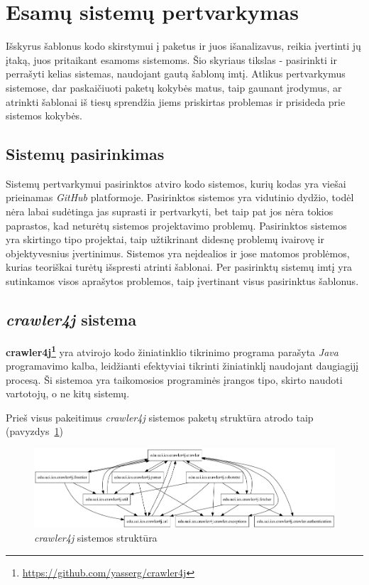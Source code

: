 \section{Esamų sistemų pertvarkymas}
Išskyrus šablonus kodo skirstymui į paketus ir juos išanalizavus, reikia įvertinti jų įtaką, juos pritaikant esamoms sistemoms.
Šio skyriaus tikslas - pasirinkti ir perrašyti kelias sistemas, naudojant gautą šablonų imtį.
Atlikus pertvarkymus sistemose, dar paskaičiuoti paketų kokybės matus,
taip gaunant įrodymus, ar atrinkti šablonai iš tiesų sprendžia
jiems priskirtas problemas ir prisideda prie sistemos kokybės.


\subsection{Sistemų pasirinkimas}
Sistemų pertvarkymui pasirinktos atviro kodo sistemos, kurių kodas yra viešai prieinamas \textit{GitHub} platformoje.
Pasirinktos sistemos yra vidutinio dydžio, todėl nėra labai sudėtinga jas suprasti ir pertvarkyti, bet taip pat jos nėra
tokios paprastos, kad neturėtų sistemos projektavimo problemų.
Pasirinktos sistemos yra skirtingo tipo projektai, taip užtikrinant didesnę problemų ivairovę ir objektyvesnius įvertinimus.
Sistemos yra neįdealios ir jose matomos problėmos, kurias teoriškai turėtų išspresti atrinti šablonai.
Per pasirinktų sistemų imtį yra sutinkamos visos aprašytos problemos, taip įvertinant visus pasirinktus šablonus.

\subsection{\textit{crawler4j} sistema}
\textbf{crawler4j\footnote{\url{https://github.com/yasserg/crawler4j}}} yra atvirojo kodo
žiniatinklio tikrinimo  programa parašyta \textit{Java} programavimo kalba, leidžianti
efektyviai tikrinti žiniatinklį naudojant daugiagijį  procesą.
Ši sistemoa yra taikomosios programinės įrangos tipo, skirto naudoti vartotojų, o ne kitų sistemų.

Prieš visus pakeitimus \textit{crawler4j} sistemos paketų struktūra atrodo taip (pavyzdys~\ref{fig:crawler_packages_orig})
\begin{figure}[H]
    \centering
    \includegraphics[scale=0.5]{img/crawler_packages_orig}
    \caption{\textit{crawler4j} sistemos struktūra}
    \label{fig:crawler_packages_orig}
\end{figure}

